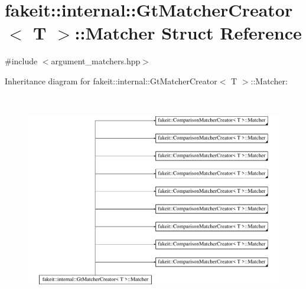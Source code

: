 \hypertarget{structfakeit_1_1internal_1_1GtMatcherCreator_1_1Matcher}{}\section{fakeit\+::internal\+::Gt\+Matcher\+Creator$<$ T $>$\+::Matcher Struct Reference}
\label{structfakeit_1_1internal_1_1GtMatcherCreator_1_1Matcher}


{\ttfamily \#include $<$argument\+\_\+matchers.\+hpp$>$}

Inheritance diagram for fakeit\+::internal\+::Gt\+Matcher\+Creator$<$ T $>$\+::Matcher\+:\begin{figure}[H]
\begin{center}
\leavevmode
\includegraphics[height=9.427609cm]{structfakeit_1_1internal_1_1GtMatcherCreator_1_1Matcher}
\end{center}
\end{figure}
